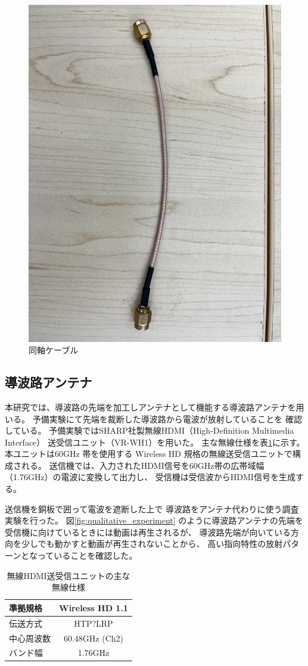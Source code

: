 \documentclass[technicalreport]{ieicej}
\begin{document}
\begin{figure}[tb]
  \begin{center}
    \includegraphics[bb=0.000000 0.000000 593.264305 791.019074, width=0.5\linewidth]{img/sma_cables.pdf}
    \caption{同軸ケーブル}
    \label{fig:sma_cables}
  \end{center}
\end{figure}

\subsection{導波路アンテナ}

本研究では、導波路の先端を加工しアンテナとして機能する導波路アンテナを用いる。
予備実験にて先端を裁断した導波路から電波が放射していることを
確認している。
予備実験ではSHARP社製無線HDMI（High-Definition Multimedia Interface）
送受信ユニット（VR-WH1）を用いた。
主な無線仕様を表\ref{table:wireless}に示す。
本ユニットは60GHz 帯を使用する Wireless HD 規格の無線送受信ユニットで構成される。
送信機では、入力されたHDMI信号を60GHz帯の広帯域幅（1.76GHz）の電波に変換して出力し、
受信機は受信波からHDMI信号を生成する。

送信機を銅板で囲って電波を遮断した上で
導波路をアンテナ代わりに使う調査実験を行った。
図\ref{fig:qualitative_experiment}
のように導波路アンテナの先端を
受信機に向けているときには動画は再生されるが、
導波路先端が向いている方向を少しでも動かすと動画が再生されないことから、
高い指向特性の放射パターンとなっていることを確認した。

\begin{table}[tb]
  \centering
  \label{table:wireless}
  \caption{無線HDMI送受信ユニットの主な無線仕様}
  \begin{tabular}{lc}
    \hline
    準拠規格 & Wireless HD 1.1 \\
    \hline\hline
    伝送方式 & HTP?LRP \\
    \hline
    中心周波数 & 60.48GHz (Ch2) \\
    \hline
    バンド幅 & 1.76GHz \\
    \hline
  \end{tabular}
 \end{table}
\end{document}

